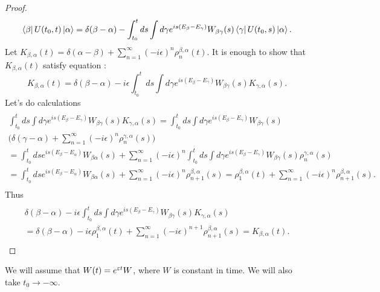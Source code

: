 \documentclass[main.tex]{subfiles}
\begin{document}
\begin{proof}
\begin{equation}
\bra{\beta} U(t_0, t) \ket{\alpha} = \delta(\beta - \alpha) - \int_{t_0}^t ds \int d\gamma e^{is(E_\beta - E_\gamma)} W_{\beta\gamma}(s) \bra{\gamma}U(t_0, s)\ket{\alpha}.
\end{equation}
Let $K_{\beta, \alpha}(t) = \delta(\alpha - \beta) + \sum_{n=1}^\infty (-i\epsilon)^n \rho^{\beta,\alpha}_n(t)$. It is enough to show that $K_{\beta, \alpha}(t)$ satisfy equation :
\begin{equation}
K_{\beta, \alpha}(t) = \delta(\beta - \alpha) - i\epsilon \int_{t_0}^t ds \int d\gamma e^{is(E_\beta - E_\gamma)} W_{\beta\gamma}(s) K_{\gamma, \alpha}(s).
\end{equation} 
Let's do calculations
\begin{multline*}
\\
\int_{t_0}^t ds \int d\gamma e^{is(E_\beta - E_\gamma)} W_{\beta\gamma}(s) K_{\gamma, \alpha}(s) = 
\int_{t_0}^t ds \int d\gamma e^{is(E_\beta - E_\gamma)} W_{\beta\gamma}(s) \\
\bigg(\delta(\gamma - \alpha) + \sum_{n=1}^\infty (-i\epsilon)^n \rho^{\gamma,\alpha}_n(s)  \bigg) \\
= \int_{t_0}^t ds e^{is(E_\beta - E_\alpha)} W_{\beta\alpha}(s) + 
\sum_{n=1}^\infty (-i\epsilon)^n \int_{t_0}^t ds \int d\gamma e^{is(E_\beta - E_\gamma)} W_{\beta\gamma}(s) \rho^{\gamma,\alpha}_n(s)\\
=  \int_{t_0}^t ds e^{is(E_\beta - E_\alpha)} W_{\beta\alpha}(s) + \sum_{n=1}^\infty (-i\epsilon)^n \rho^{\beta,\alpha}_{n+1}(s) = \rho_1^{\beta,\alpha}(t) + \sum_{n=1}^\infty (-i\epsilon)^n \rho^{\beta,\alpha}_{n+1}(s).\\
\end{multline*}
Thus
\begin{multline*}\\
\delta(\beta - \alpha) - i\epsilon \int_{t_0}^t ds \int d\gamma e^{is(E_\beta - E_\gamma)} W_{\beta\gamma}(s) K_{\gamma, \alpha}(s) \\
= \delta(\beta - \alpha)-i\epsilon \rho_1^{\beta,\alpha}(t) + \sum_{n=1}^\infty (-i\epsilon)^{n + 1} \rho^{\beta,\alpha}_{n+1}(s) = K_{\beta, \alpha}(t).\\
\end{multline*}

\end{proof}

We will assume that $W(t) = e^{\eepsilon t} W$, where $W$ is constant in time. We will also take $t_0\to -\infty$. 
\end{document}
